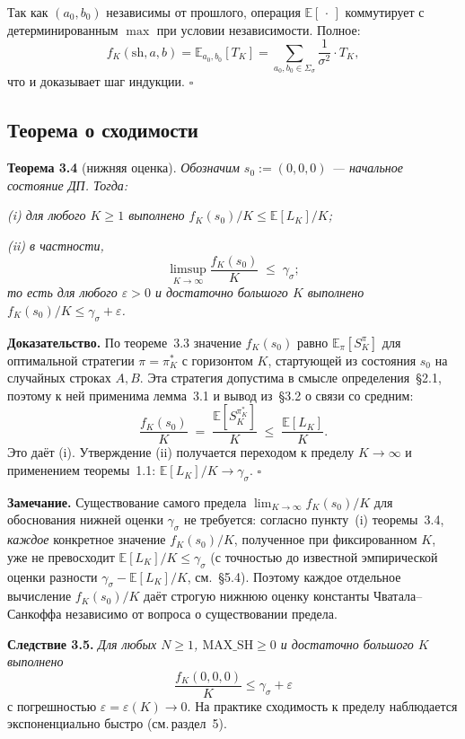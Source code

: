 Так как $(a_0, b_0)$ независимы от прошлого, операция $\mathbb{E}[\,\cdot\,]$ коммутирует с детерминированным $\max$ при условии независимости. Полное:
\[
    f_K(\mathrm{sh}, a, b) = \mathbb{E}_{a_0, b_0}[T_K] = \sum_{a_0, b_0 \in \Sigma_\sigma} \frac{1}{\sigma^2} \cdot T_K,
\]
что и доказывает шаг индукции. \hfill$\square$

\subsection{Теорема о сходимости}

\textbf{Теорема 3.4} (нижняя оценка).
\emph{Обозначим $s_0 := (0, 0, 0)$ --- начальное состояние ДП. Тогда:}

\emph{(i) для любого $K \geq 1$ выполнено $f_K(s_0) / K \leq \mathbb{E}[L_K]/K$;}

\emph{(ii) в частности,
\[
    \limsup_{K \to \infty} \frac{f_K(s_0)}{K} \;\leq\; \gamma_\sigma;
\]
то есть для любого $\varepsilon > 0$ и достаточно большого $K$ выполнено $f_K(s_0)/K \leq \gamma_\sigma + \varepsilon$.}

\textbf{Доказательство.} По теореме~3.3 значение $f_K(s_0)$ равно $\mathbb{E}_\pi[S_K^\pi]$ для оптимальной стратегии $\pi = \pi^\ast_K$ с горизонтом $K$, стартующей из состояния $s_0$ на случайных строках $A, B$. Эта стратегия допустима в смысле определения~\S2.1, поэтому к ней применима лемма~3.1 и вывод из~\S3.2 о связи со средним:
\[
    \frac{f_K(s_0)}{K} \;=\; \frac{\mathbb{E}[S_K^{\pi^\ast_K}]}{K} \;\leq\; \frac{\mathbb{E}[L_K]}{K}.
\]
Это даёт (i). Утверждение (ii) получается переходом к пределу $K \to \infty$ и применением теоремы~1.1: $\mathbb{E}[L_K]/K \to \gamma_\sigma$. \hfill$\square$

\smallskip

\textbf{Замечание.} Существование самого предела $\lim_{K \to \infty} f_K(s_0)/K$ для обоснования нижней оценки $\gamma_\sigma$ не требуется: согласно пункту~(i) теоремы~3.4, \emph{каждое} конкретное значение $f_K(s_0)/K$, полученное при фиксированном $K$, уже не превосходит $\mathbb{E}[L_K]/K \leq \gamma_\sigma$ (с точностью до известной эмпирической оценки разности $\gamma_\sigma - \mathbb{E}[L_K]/K$, см.~\S5.4). Поэтому каждое отдельное вычисление $f_K(s_0)/K$ даёт строгую нижнюю оценку константы Чватала--Санкоффа независимо от вопроса о существовании предела.

\textbf{Следствие 3.5.} \emph{Для любых $N \geq 1$, $\mathrm{MAX\_SH} \geq 0$ и достаточно большого $K$ выполнено}
\[
    \frac{f_K(0, 0, 0)}{K} \leq \gamma_\sigma + \varepsilon
\]
с погрешностью $\varepsilon = \varepsilon(K) \to 0$. На практике сходимость к пределу наблюдается экспоненциально быстро (см.\,раздел~5).

